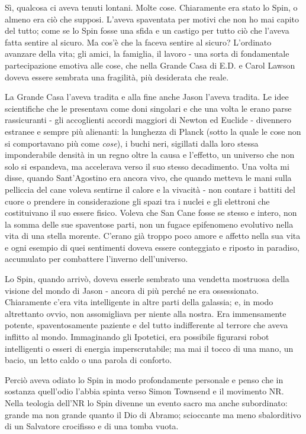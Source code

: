 Sì, qualcosa ci aveva tenuti lontani. Molte cose. Chiaramente era stato
lo Spin, o almeno era ciò che supposi. L'aveva spaventata per motivi che
non ho mai capito del tutto; come se lo Spin fosse una sfida e un
castigo per tutto ciò che l'aveva fatta sentire al sicuro. Ma cos'è che
la faceva sentire al sicuro? L'ordinato avanzare della vita; gli amici,
la famiglia, il lavoro - una sorta di fondamentale partecipazione
emotiva alle cose, che nella Grande Casa di E.D. e Carol Lawson doveva
essere sembrata una fragilità, più desiderata che reale.

La Grande Casa l'aveva tradita e alla fine anche Jason l'aveva tradita.
Le idee scientifiche che le presentava come doni singolari e che una
volta le erano parse rassicuranti - gli accoglienti accordi maggiori di
Newton ed Euclide - divennero estranee e sempre più alienanti: la
lunghezza di Planck (sotto la quale le cose non si comportavano più come
\emph{cose}), i buchi neri, sigillati dalla loro stessa imponderabile
densità in un regno oltre la causa e l'effetto, un universo che non solo
si espandeva, ma accelerava verso il suo stesso decadimento. Una volta
mi disse, quando Sant'Agostino era ancora vivo, che quando metteva le
mani sulla pelliccia del cane voleva sentirne il calore e la vivacità -
non contare i battiti del cuore o prendere in considerazione gli spazi
tra i nuclei e gli elettroni che costituivano il suo essere fisico.
Voleva che San Cane fosse se stesso e intero, non la somma delle sue
spaventose parti, non un fugace epifenomeno evolutivo nella vita di una
stella morente. C'erano già troppo poco amore e affetto nella sua vita e
ogni esempio di quei sentimenti doveva essere conteggiato e riposto in
paradiso, accumulato per combattere l'inverno dell'universo.

Lo Spin, quando arrivò, doveva esserle sembrato una vendetta mostruosa
della visione del mondo di Jason - ancora di più perché ne era
ossessionato. Chiaramente c'era vita intelligente in altre parti della
galassia; e, in modo altrettanto ovvio, non assomigliava per niente alla
nostra. Era immensamente potente, spaventosamente paziente e del tutto
indifferente al terrore che aveva inflitto al mondo. Immaginando gli
Ipotetici, era possibile figurarsi robot intelligenti o esseri di
energia imperscrutabile; ma mai il tocco di una mano, un bacio, un letto
caldo o una parola di conforto.

Perciò aveva odiato lo Spin in modo profondamente personale e penso che
in sostanza quell'odio l'abbia spinta verso Simon Townsend e il
movimento NR. Nella teologia dell'NR lo Spin divenne un evento sacro ma
anche subordinato: grande ma non grande quanto il Dio di Abramo;
scioccante ma meno sbalorditivo di un Salvatore crocifisso e di una
tomba vuota.

